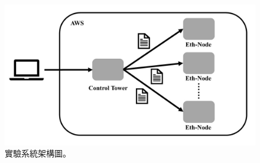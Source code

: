 \begin{figure}[htbp]
\centering
\includegraphics[scale=0.5]{images/51.jpg}
\caption{實驗系統架構圖。}
\label{i:byz-latency}
\end{figure}